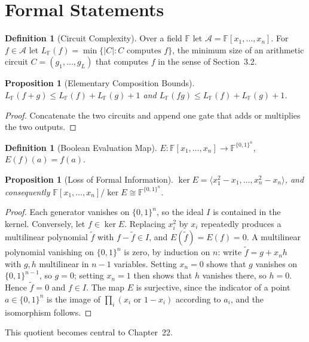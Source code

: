 \documentclass[11pt,letterpaper]{report}
\theoremstyle{plain}
\newtheorem{proposition}[theorem]{Proposition}
\theoremstyle{definition}
\newtheorem{definition}[theorem]{Definition}
\theoremstyle{remark}
\begin{document}
\section{Formal Statements}

\begin{definition}[Circuit Complexity]
Over a field $\mathbb F$ let $\mathcal A=\mathbb F[x_1,\ldots,x_n]$. For $f\in\mathcal A$ let $L_{\mathbb F}(f)=\min\{|C|:C\text{ computes }f\}$, the minimum size of an arithmetic circuit $C=(g_1,\ldots,g_L)$ that computes $f$ in the sense of Section~3.2.
\end{definition}

\begin{proposition}[Elementary Composition Bounds]
$L_{\mathbb F}(f+g)\le L_{\mathbb F}(f)+L_{\mathbb F}(g)+1$ and $L_{\mathbb F}(fg)\le L_{\mathbb F}(f)+L_{\mathbb F}(g)+1$.
\end{proposition}
\begin{proof}
Concatenate the two circuits and append one gate that adds or multiplies the two outputs.
\end{proof}

\begin{definition}[Boolean Evaluation Map]
$E:\mathbb F[x_1,\ldots,x_n]\to\mathbb F^{\{0,1\}^n}$, $E(f)(a)=f(a)$.
\end{definition}

\begin{proposition}[Loss of Formal Information]\label{pr:kernelE}
$\ker E=\langle x_1^2-x_1,\ldots,x_n^2-x_n\rangle$, and consequently $\mathbb F[x_1,\ldots,x_n]/\ker E\cong\mathbb F^{\{0,1\}^n}$.
\end{proposition}
\begin{proof}
Each generator vanishes on $\{0,1\}^n$, so the ideal $I$ is contained in the kernel. Conversely, let $f\in\ker E$. Replacing $x_i^2$ by $x_i$ repeatedly produces a multilinear polynomial $\tilde f$ with $f-\tilde f\in I$, and $E(\tilde f)=E(f)=0$. A multilinear polynomial vanishing on $\{0,1\}^n$ is zero, by induction on $n$: write $\tilde f=g+x_nh$ with $g,h$ multilinear in $n-1$ variables. Setting $x_n=0$ shows that $g$ vanishes on $\{0,1\}^{n-1}$, so $g=0$; setting $x_n=1$ then shows that $h$ vanishes there, so $h=0$. Hence $\tilde f=0$ and $f\in I$. The map $E$ is surjective, since the indicator of a point $a\in\{0,1\}^n$ is the image of $\prod_i(x_i\text{ or }1-x_i)$ according to $a_i$, and the isomorphism follows.
\end{proof}

This quotient becomes central to Chapter~22.
\end{document}
